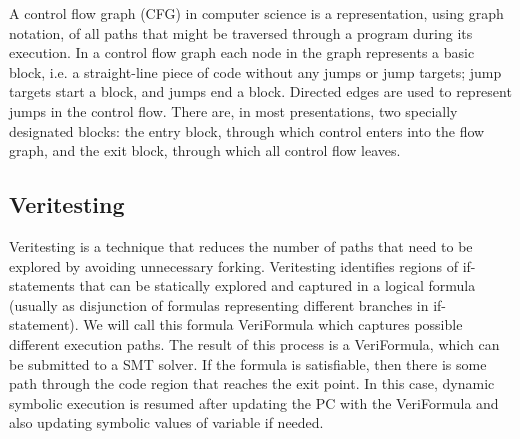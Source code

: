 A control flow graph (CFG) in computer science is a representation, using graph notation, of all paths that might be traversed through a program during its execution.
In a control flow graph each node in the graph represents a basic block, i.e. a straight-line piece of code without any jumps or jump targets; jump targets start a block, and jumps end a block. Directed edges are used to represent jumps in the control flow. There are, in most presentations, two specially designated blocks: the entry block, through which control enters into the flow graph, and the exit block, through which all control flow leaves.


\subsection{Veritesting}
Veritesting\cite{veritesting} is a technique that reduces the number of paths that need to be explored by avoiding unnecessary forking.
%
Veritesting identifies regions of if-statements that can be statically explored and captured in a logical formula (usually as disjunction of formulas representing different branches in if-statement).
%
We will call this formula VeriFormula which captures possible different execution paths.
%
The result of this process is a VeriFormula, which can be submitted to a SMT solver.
%
If the formula is satisfiable, then there is some path through the code region that reaches the exit point. In this case, dynamic symbolic execution is resumed after updating the PC with the VeriFormula and also updating symbolic values of variable if needed.
\fi

